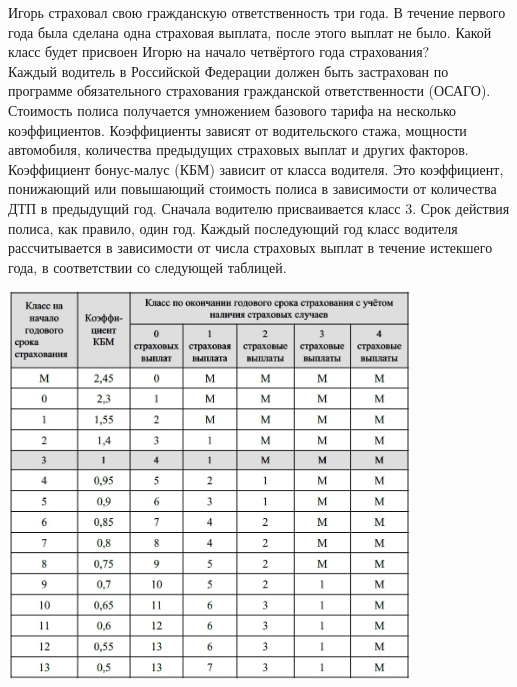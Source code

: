 \begin{homework}[number=2]
	\begin{listofex}
		\item Игорь страховал свою гражданскую ответственность три года. В течение первого года была сделана одна
		страховая выплата, после этого выплат не было. Какой класс будет присвоен Игорю на начало четвёртого
		года страхования?\\
		Каждый водитель в Российской Федерации должен быть застрахован по программе обязательного
		страхования гражданской ответственности (ОСАГО). Стоимость полиса получается умножением базового
		тарифа на несколько коэффициентов. Коэффициенты зависят от водительского стажа, мощности автомобиля,
		количества предыдущих страховых выплат и других факторов.\\
		Коэффициент бонус-малус (КБМ) зависит от класса водителя. Это коэффициент, понижающий или
		повышающий стоимость полиса в зависимости от количества ДТП в предыдущий год. Сначала водителю
		присваивается класс 3. Срок действия полиса, как правило, один год. Каждый последующий год класс
		водителя рассчитывается в зависимости от числа страховых выплат в течение истекшего года, в соответствии
		со следующей таблицей.\\
		\begin{center}
			\includegraphics[align=t, width=0.8\textwidth]{pics/G91M3H2-1}
		\end{center}

\end{listofex}
\end{homework}
